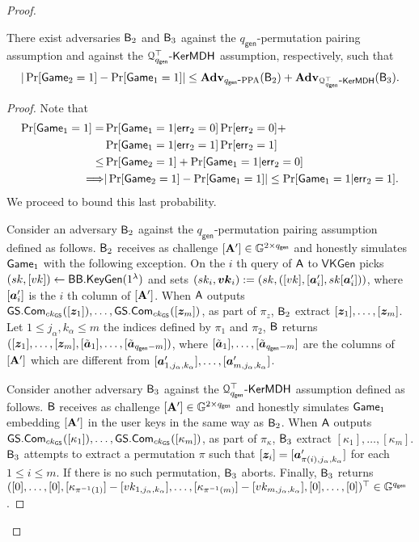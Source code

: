 \begin{proof}
\begin{lemma} There exist adversaries $\mathsf{B}_2$ and $\mathsf{B}_3$ against the ${q_\mathsf{gen}}$-permutation pairing assumption and against the $\mathcal{Q}^\top_{{q_\mathsf{gen}}}\mbox{-}\mathsf{KerMDH}$ assumption, respectively, such that
$$
|\Pr[\mathsf{Game}_2=1]-\Pr[\mathsf{Game}_1=1]|\leq \mathbf{Adv}_{{q_\mathsf{gen}}\mbox{-}\mathrm{PPA}}(\mathsf{B}_2)+\mathbf{Adv}_{\mathcal{Q}^\top_{{q_\mathsf{gen}}}\mbox{-}\mathsf{KerMDH}}(\mathsf{B}_3).
$$
\end{lemma}
\begin{proof}
Note that
\begin{align*}
\Pr[\mathsf{Game}_1=1]
 = &\Pr[\mathsf{Game}_1=1|\mathsf{err}_2=0]\Pr[\mathsf{err}_2=0]+\\
&\Pr[\mathsf{Game}_1=1|\mathsf{err}_2=1]\Pr[\mathsf{err}_2=1]\\
 \leq& \Pr[\mathsf{Game}_2=1] + \Pr[\mathsf{Game}_1=1|\mathsf{err}_2=0]\\
\Longrightarrow  &|\Pr[\mathsf{Game}_2=1]-\Pr[\mathsf{Game}_1=1]|\leq \Pr[\mathsf{Game}_1=1|\mathsf{err}_2=1].
\end{align*}
We proceed to bound this last probability.

Consider an adversary $\mathsf{B}_2$ against the ${q_\mathsf{gen}}$-permutation pairing assumption defined as follows. $\mathsf{B}_2$ receives as challenge $[\mathbf{{A}}']\in\mathbb{G}^{2\times {q_\mathsf{gen}}}$ and honestly simulates $\mathsf{Game}_1$ with the following exception. On the $i$ th query of $\mathsf{A}$ to $\mathsf{VKGen}$ picks $(sk,[vk])\gets\mathsf{BB}.\mathsf{KeyGen}(1^\lambda)$ and sets $(sk_i,{\boldsymbol{vk}}_i):=(sk,([vk],[{\boldsymbol{a}}'_i],sk[{\boldsymbol{a}}'_i]))$, where $[{\boldsymbol{a}}'_i]$ is the $i$ th column of $[\mathbf{{A}}']$. When $\mathsf{A}$ outputs ${\mathsf{GS}}.\mathsf{Com}_{ck_{\mathsf{GS}}}([{\boldsymbol{z}}_1]),\ldots,\allowbreak{\mathsf{GS}}.\mathsf{Com}_{ck_{\mathsf{GS}}}([{\boldsymbol{z}}_m])$, as part of $\pi_z$, $\mathsf{B}_2$ extract $[{\boldsymbol{z}}_1],\ldots,[{\boldsymbol{z}}_m]$.  Let $1\leq j_\alpha,k_\alpha\leq m$ the indices defined by $\pi_1$ and $\pi_2$, $\mathsf{B}$ returns $([{\boldsymbol{z}}_1],\ldots,[{\boldsymbol{z}}_m],[\tilde{{\boldsymbol{a}}}_1],\ldots,[\tilde{{\boldsymbol{a}}}_{{q_\mathsf{gen}}-m}])$, where $[\tilde{{\boldsymbol{a}}}_1],\ldots,[\tilde{{\boldsymbol{a}}}_{{q_\mathsf{gen}}-m}]$ are the columns of $[\mathbf{{A}}']$ which are different from $[{\boldsymbol{a}}'_{1,j_\alpha,k_\alpha}],\ldots,\allowbreak[{\boldsymbol{a}}'_{m,j_\alpha,k_\alpha}]$.

Consider another adversary $\mathsf{B}_3$ against the $\mathcal{Q}_{q_\mathsf{gen}}^\top\mbox{-}\mathsf{KerMDH}$ assumption defined as follows. $\mathsf{B}$ receives as challenge $[\mathbf{{A}}']\in\mathbb{G}^{2\times {q_\mathsf{gen}}}$ and honestly simulates $\mathsf{Game}_1$ embedding $[\mathbf{{A}}']$ in the user keys in the same way as $\mathsf{B}_2$. When $\mathsf{A}$ outputs ${\mathsf{GS}}.\mathsf{Com}_{ck_{\mathsf{GS}}}([\kappa_1]),\ldots,\allowbreak{\mathsf{GS}}.\mathsf{Com}_{ck_{\mathsf{GS}}}([\kappa_m])$, as part of $\pi_\kappa$, $\mathsf{B}_3$ extract $[\kappa_1],\ldots,[\kappa_m]$. $\mathsf{B}_3$ attempts to extract a permutation $\pi$ such that  $[{\boldsymbol{z}}_i]=[{\boldsymbol{a}}'_{\pi(i),j_\alpha,k_\alpha}]$ for each $1\leq i\leq m$. If there is no such permutation, $\mathsf{B}_3$ aborts. Finally, $\mathsf{B}_3$ returns $([0],\ldots,[0],\allowbreak [\kappa_{\pi^{-1}(1)}]-[vk_{1,j_\alpha,k_\alpha}],\ldots,[\kappa_{\pi^{-1}(m)}]-[vk_{m,j_\alpha,k_\alpha}],[0],\ldots,[0])^\top\in\mathbb{G}^{{q_\mathsf{gen}}}$.


\end{proof}
\end{proof}
